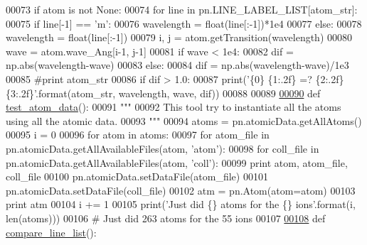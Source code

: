 \begin{DoxyCode}
00073         \textcolor{keywordflow}{if} atom \textcolor{keywordflow}{is} \textcolor{keywordflow}{not} \textcolor{keywordtype}{None}:
00074             \textcolor{keywordflow}{for} line \textcolor{keywordflow}{in} pn.LINE\_LABEL\_LIST[atom\_str]:
00075                 \textcolor{keywordflow}{if} line[-1] == \textcolor{stringliteral}{'m'}:
00076                     wavelength = float(line[:-1])*1e4
00077                 \textcolor{keywordflow}{else}:
00078                     wavelength = float(line[:-1])
00079                 i, j = atom.getTransition(wavelength)
00080                 wave = atom.wave\_Ang[i-1, j-1]
00081                 \textcolor{keywordflow}{if} wave < 1e4:
00082                     dif = np.abs(wavelength-wave)
00083                 \textcolor{keywordflow}{else}:
00084                     dif = np.abs(wavelength-wave)/1e3
00085                 \textcolor{comment}{#print atom\_str}
00086                 \textcolor{keywordflow}{if} dif > 1.0:
00087                     print(\textcolor{stringliteral}{'\{0\} \{1:.2f\} =? \{2:.2f\}  \{3:.2f\}'}.format(atom\_str, wavelength, wave, dif))
00088                     
00089 
\hypertarget{test__lines_8py_source_l00090}{}\hyperlink{namespacepyneb_1_1test_1_1test__lines_a8db24c6e938952a1ab108577567f2d7c}{00090} \textcolor{keyword}{def }\hyperlink{namespacepyneb_1_1test_1_1test__lines_a8db24c6e938952a1ab108577567f2d7c}{test\_atom\_data}():
00091     \textcolor{stringliteral}{"""}
00092 \textcolor{stringliteral}{    This tool try to instantiate all the atoms using all the atomic data.}
00093 \textcolor{stringliteral}{    """}
00094     atoms = pn.atomicData.getAllAtoms()
00095     i = 0
00096     \textcolor{keywordflow}{for} atom \textcolor{keywordflow}{in} atoms:
00097         \textcolor{keywordflow}{for} atom\_file \textcolor{keywordflow}{in} pn.atomicData.getAllAvailableFiles(atom, \textcolor{stringliteral}{'atom'}):
00098             \textcolor{keywordflow}{for} coll\_file \textcolor{keywordflow}{in} pn.atomicData.getAllAvailableFiles(atom, \textcolor{stringliteral}{'coll'}):
00099                 \textcolor{keywordflow}{print} atom, atom\_file, coll\_file
00100                 pn.atomicData.setDataFile(atom\_file)
00101                 pn.atomicData.setDataFile(coll\_file)
00102                 atm = pn.Atom(atom=atom)
00103                 \textcolor{keywordflow}{print} atm
00104                 i += 1
00105     print(\textcolor{stringliteral}{'Just did \{\} atoms for the \{\} ions'}.format(i, len(atoms)))
00106     \textcolor{comment}{# Just did 263 atoms for the 55 ions}
00107 
\hypertarget{test__lines_8py_source_l00108}{}\hyperlink{namespacepyneb_1_1test_1_1test__lines_ac3883054959f6ecfe33f8437d9a925c8}{00108} \textcolor{keyword}{def }\hyperlink{namespacepyneb_1_1test_1_1test__lines_ac3883054959f6ecfe33f8437d9a925c8}{compare\_line\_list}():

\end{DoxyCode}
